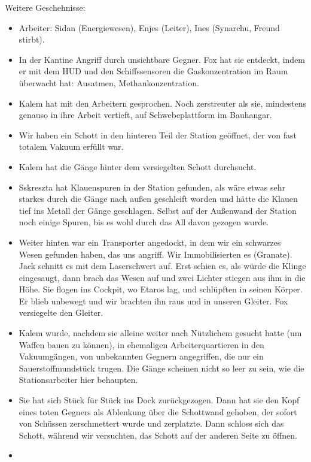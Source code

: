 \documentclass[11pt]{article}
\begin{document}
Weitere Geschehnisse:

\begin{itemize}
\item
  Arbeiter: Sidan (Energiewesen), Enjes (Leiter), Ines (Synarchu, Freund
  stirbt).
\item
  In der Kantine Angriff durch unsichtbare Gegner. Fox hat sie entdeckt,
  indem er mit dem HUD und den Schiffssensoren die Gaskonzentration im
  Raum überwacht hat: Ausatmen, Methankonzentration.
\item
  Kalem hat mit den Arbeitern gesprochen. Noch zerstreuter als sie,
  mindestens genauso in ihre Arbeit vertieft, auf Schwebeplattform im
  Bauhangar.
\item
  Wir haben ein Schott in den hinteren Teil der Station geöffnet, der
  von fast totalem Vakuum erfüllt war.
\item
  Kalem hat die Gänge hinter dem versiegelten Schott durchsucht.
\item
  Sskreszta hat Klauenspuren in der Station gefunden, als wäre etwas
  sehr starkes durch die Gänge nach außen geschleift worden und hätte
  die Klauen tief ins Metall der Gänge geschlagen. Selbst auf der
  Außenwand der Station noch einige Spuren, bis es wohl durch das All
  davon gezogen wurde.
\item
  Weiter hinten war ein Transporter angedockt, in dem wir ein schwarzes
  Wesen gefunden haben, das uns angriff. Wir Immobilisierten es
  (Granate). Jack schnitt es mit dem Laserschwert auf. Erst schien es,
  als würde die Klinge eingesaugt, dann brach das Wesen auf und zwei
  Lichter stiegen aus ihm in die Höhe. Sie flogen ins Cockpit, wo Etaros
  lag, und schlüpften in seinen Körper. Er blieb unbewegt und wir
  brachten ihn raus und in unseren Gleiter. Fox versiegelte den Gleiter.
\item
  Kalem wurde, nachdem sie alleine weiter nach Nützlichem gesucht hatte
  (um Waffen bauen zu können), in ehemaligen Arbeiterquartieren in den
  Vakuumgängen, von unbekannten Gegnern angegriffen, die nur ein
  Sauerstoffmundstück trugen. Die Gänge scheinen nicht so leer zu sein,
  wie die Stationsarbeiter hier behaupten.
\item
  Sie hat sich Stück für Stück ins Dock zurückgezogen. Dann hat sie den
  Kopf eines toten Gegners als Ablenkung über die Schottwand gehoben,
  der sofort von Schüssen zerschmettert wurde und zerplatzte. Dann
  schloss sich das Schott, während wir versuchten, das Schott auf der
  anderen Seite zu öffnen.
\item

\end{itemize}
\end{document}
